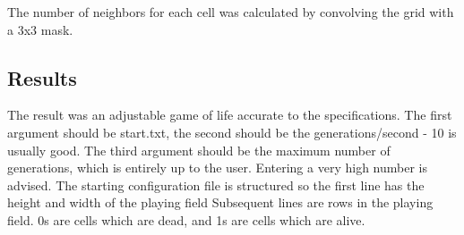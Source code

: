 The number of neighbors for each cell was calculated by convolving the grid with a 3x3 mask.

\subsection{Results}

The result was an adjustable game of life accurate to the specifications.   The first argument should be start.txt, the second should be the generations/second - 10 is usually good.  The third argument should be the maximum number of generations, which is entirely up to the user.  Entering a very high number is advised. The starting configuration file is structured so the first line has the height and width of the playing field Subsequent lines are rows in the playing field.  0s are cells which are dead, and 1s are cells which are alive.